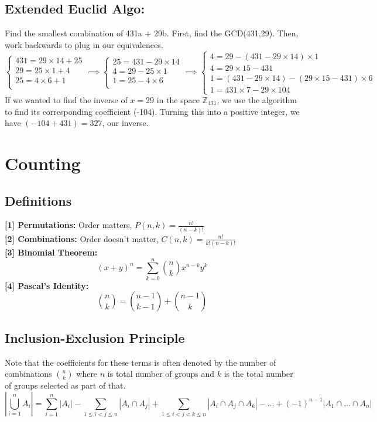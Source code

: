 \subsection{Extended Euclid Algo:} Find the smallest combination of 431a + 29b. First, find the GCD(431,29). Then, work backwards to plug in our equivalences.
$$
\begin{cases}
431 = 29 \times 14 + 25 \\
29 = 25 \times 1 + 4 \\
25 = 4 \times 6 + 1 \\
\end{cases} \implies 
\begin{cases}
25 = 431 - 29 \times 14 \\
4 = 29 - 25 \times 1 \\
1 = 25 - 4 \times 6 \\
\end{cases} \implies 
\begin{cases}
4 = 29 - (431 - 29 \times 14) \times 1\\
4 = 29 \times 15 - 431 \\
1 = (431 - 29 \times 14) - (29 \times 15 - 431) \times 6 \\
1 = 431 \times 7 - 29 \times 104
\end{cases}
$$
If we wanted to find the inverse of $x = 29$ in the space $\mathbb{Z}_{431}$, we use the algorithm to find its corresponding coefficient (-104). Turning this into a positive integer, we have $(-104 + 431) = 327$, our inverse. 

\pagebreak
\section{Counting}
\subsection{Definitions}
\textbf{[1] Permutations:} Order matters, $P(n,k) = \frac{n!}{(n-k)!}$\\
\textbf{[2] Combinations:} Order doesn't matter, $C(n,k) = \frac{n!}{k!(n-k)!}$\\
\textbf{[3] Binomial Theorem:} 
$$
(x+y)^n = \sum_{k=0}^n {n \choose k} x^{n-k}y^k
$$
\textbf{[4] Pascal's Identity:} 
$$
{n \choose k} = {n-1 \choose k-1} + {n - 1 \choose k}
$$
\subsection{Inclusion-Exclusion Principle}
Note that the coefficients for these terms is often denoted by the number of combinations ${n \choose k}$ where $n$ is total number of groups and $k$ is the total number of groups selected as part of that.
$$
\left|\bigcup_{i = 1}^{n} A_i\right| = \sum_{i=1}^n |A_i| - \sum_{1 \leq i < j \leq n} |A_i \cap A_j| + \sum_{1 \leq i < j < k \leq n} |A_i \cap A_j \cap A_k| - \dots + (-1)^{n-1} |A_1 \cap \dots \cap A_n|
$$

